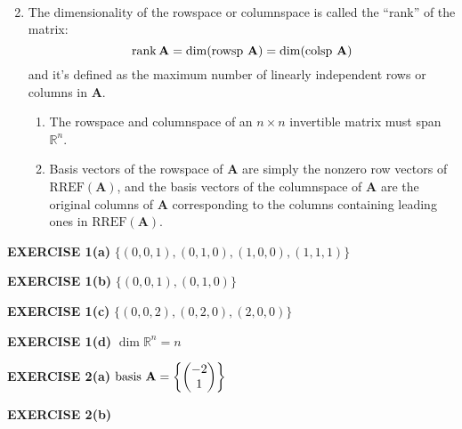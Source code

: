 \documentclass[12pt]{article}
\newcommand{\mat}[1]{\mathbf{#1}}
\newcommand{\exercise}[1]{\textbf{EXERCISE #1}\label{#1}}
\newcommand{\rref}{\text{RREF}}
\newcommand{\rowsp}{\text{rowsp }}
\newcommand{\colsp}{\text{colsp }}
\newcommand{\basis}{\text{basis }}
\begin{document}
\begin{enumerate}
\begin{gather}
\end{gather}
\item The dimensionality of the rowspace or columnspace is called the ``rank'' of the matrix: 
\begin{equation}
\rank \mat{A} = \dim( \rowsp \mat{A} ) = \dim( \colsp \mat{A} )
\end{equation}
and it's defined as the maximum number of linearly independent rows or columns in $\mat{A}$.
\begin{enumerate}
\item The rowspace and columnspace of an $n \times n$ invertible matrix must span $\mathbb{R}^{n}$.
\item Basis vectors of the rowspace of $\mat{A}$ are simply the nonzero row vectors of $\rref( \mat{A} )$, and the basis vectors of the columnspace of $\mat{A}$ are the original columns of $\mat{A}$ corresponding to the columns containing leading ones in $\rref( \mat{A} )$.
\end{enumerate}
\end{enumerate}

\exercise{1(a)} $\{ (0,0,1), (0,1,0), (1,0,0), (1,1,1) \}$

\exercise{1(b)} $\{ (0,0,1), (0,1,0) \}$

\exercise{1(c)} $\{ (0,0,2), (0,2,0), (2,0,0) \}$

\exercise{1(d)} $\dim \mathbb{R}^{n} = n$

\exercise{2(a)} $\basis \null \mat{A} = \left\{ \begin{pmatrix} -2 \\ 1 \end{pmatrix} \right\}$

\exercise{2(b)} 
\end{document}
